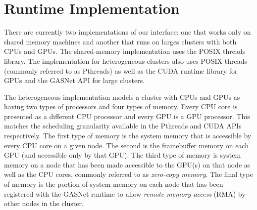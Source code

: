 
\section{Runtime Implementation}
\label{sec:impl}

There are currently two implementations of our interface:
one that works only on shared memory machines and another that
runs on larges clusters with both CPUs and GPUs.  The shared-memory
implementation uses the POSIX threads library.
The implementation for heterogeneous clusters also uses POSIX
threads\cite{PTHREADS} (commonly referred to as Pthreads) as 
well as the CUDA runtime library for GPUs\cite{CUDA} and the GASNet
API for large clusters\cite{GASNET07}.  

The heterogeneous implementation
models a cluster with CPUs and GPUs as having two types of processors 
and four types of memory.  Every CPU core is presented as a different CPU processor
and every GPU is a GPU processor.  This matches the scheduling granularity available
in the Pthreads and CUDA APIs respectively.  The first type of memory is the 
system memory that is accessible by every CPU core on a given node.  The second is the 
framebuffer memory on each GPU (and accessible only by that GPU).  The third type
of memory is system memory on a node that has been made accessible to the GPU(s) on
that node as well as the CPU cores, commonly referred to as {\em zero-copy memory}.
The final type of memory is the portion of system memory on each node that has been registered with
the GASNet runtime to allow {\em remote memory access} (RMA) by other nodes in the cluster.

